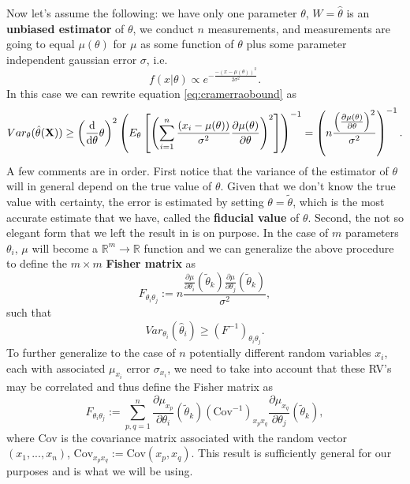 \documentclass[11pt]{article} %
\DeclareRobustCommand{\d}{\ifmmode\text{d}\else d\fi}
\newcommand{\br}[1]{\ensuremath{\left( #1 \right)}}
\newcommand{\sbr}[1]{\ensuremath{\left[ #1 \right]}}
\begin{document}
Now let's assume the following: we have only one parameter $\theta$, $W=\hat\theta$ is an \textbf{unbiased estimator} of $\theta$, we conduct $n$ measurements, and measurements are going to equal $\mu(\theta)$ for $\mu$ as some function of $\theta$ plus some parameter independent gaussian error $\sigma$, i.e. $$f(x|\theta)\propto e^{-\frac{-(x-\mu(\theta))^2}{2\sigma^2}}.$$
In this case we can rewrite equation \eqref{eq:cramerraobound} as
\begin{gather}
    Var_\theta(\hat\theta(\mathbf X)) 
    \geq \br{\frac{\d}{\d\theta}\theta}^2\br{E_\theta\sbr{\br{\sum_{i=1}^n \frac{(x_i-\mu(\theta))}{\sigma^2}\frac{\partial\mu(\theta)}{\partial\theta}}^2}}^{-1}
    = \br{n\frac{\br{\frac{\partial\mu(\theta)}{\partial\theta}}^2}{\sigma^2}}^{-1}.
\end{gather}
A few comments are in order. First notice that the variance of the estimator of $\theta$ will in general depend on the true value of $\theta$. Given that we don't know the true value with certainty, the error is estimated by setting $\theta=\tilde\theta$, which is the most accurate estimate that we have, called the \textbf{fiducial value} of $\theta$. Second, the not so elegant form that we left the result in is on purpose. In the case of $m$ parameters $\theta_i$, $\mu$ will become a $\mathbb R^m \rightarrow \mathbb R$ function and we can generalize the above procedure to define the $m\times m$ \textbf{Fisher matrix} as
\begin{equation}
    F_{\theta_i\theta_j} := n\frac{\frac{\partial\mu}{\partial\theta_i}(\tilde\theta_k)\frac{\partial\mu}{\partial\theta_j}(\tilde\theta_k)}{\sigma^2},
\end{equation}
such that \begin{equation}
    Var_{\theta_i}(\hat\theta_i) \geq \br{F^{-1}}_{\theta_i\theta_j}.
\end{equation}
To further generalize to the case of $n$ potentially different random variables $x_i$, each with associated $\mu_{x_i}$ error $\sigma_{x_i}$, we need to take into account that these RV's may be correlated and thus define the Fisher matrix as
\begin{equation}
    F_{\theta_i\theta_j} := \sum_{p, q=1}^n \frac{\partial\mu_{x_p}}{\partial\theta_i}(\tilde\theta_k)(\text{Cov}^{-1})_{x_px_q}\frac{\partial\mu_{x_q}}{\partial\theta_j}(\tilde\theta_k),
\end{equation}
where Cov is the covariance matrix associated with the random vector $(x_1, ..., x_n)$, $\text{Cov}_{x_px_q}:=\text{Cov}(x_p,x_q)$.
This result is sufficiently general for our purposes and is what we will be using.
\end{document}
